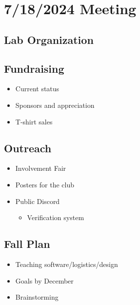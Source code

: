 
\section{7/18/2024 Meeting}
\subsection{Lab Organization}

\subsection{Fundraising}
\begin{itemize}
    \item Current status
    \item Sponsors and appreciation
    \item T-shirt sales
\end{itemize}

\subsection{Outreach}
\begin{itemize}
    \item Involvement Fair
    \item Posters for the club
    \item Public Discord
          \begin{itemize}
              \item Verification system
          \end{itemize}
\end{itemize}

\subsection{Fall Plan}
\begin{itemize}
    \item Teaching software/logistics/design
    \item Goals by December
    \item Brainstorming
\end{itemize}

